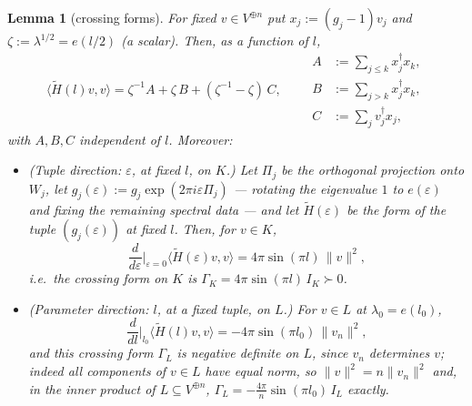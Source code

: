 \documentclass[11pt]{article}
\newtheorem{lemma}[theorem]{Lemma}
\theoremstyle{definition}
\newcommand{\Ht}{\widetilde H}
\begin{document}
\begin{lemma}[crossing forms]\label{lem:crossing}
For fixed $v\in V^{\oplus n}$ put $x_j:=(g_j-1)v_j$ and
$\zeta:=\lambda^{1/2}=e(l/2)$ (a scalar). Then, as a function of
$l$,
\begin{equation}\label{eq:ABC}
\langle\Ht(l)v,v\rangle
=\zeta^{-1}A+\zeta\,B+(\zeta^{-1}-\zeta)\,C,
\qquad
\begin{aligned}
A&:=\textstyle\sum_{j\le k}x_j^{\dagger}x_k,\\
B&:=\textstyle\sum_{j>k}x_j^{\dagger}x_k,\\
C&:=\textstyle\sum_{j}v_j^{\dagger}x_j,
\end{aligned}
\end{equation}
with $A,B,C$ independent of $l$. Moreover:
\begin{itemize}
\item[(i)] (\emph{Tuple direction}: $\varepsilon$, at fixed $l$, on $K$.) Let $\Pi_j$ be the
orthogonal projection onto $W_j$, let
$g_j(\varepsilon):=g_j\exp(2\pi i\varepsilon\Pi_j)$ --- rotating the
eigenvalue $1$ to $e(\varepsilon)$ and fixing the remaining spectral
data --- and let $\Ht(\varepsilon)$ be the form of the tuple
$(g_j(\varepsilon))$ at fixed $l$. Then, for $v\in K$,
\[
\frac{d}{d\varepsilon}\Big|_{\varepsilon=0}
\langle\Ht(\varepsilon)v,v\rangle
=4\pi\sin(\pi l)\,\lVert v\rVert^{2},
\]
i.e.\ the crossing form on $K$ is $\Gamma_K=4\pi\sin(\pi l)\,I_K\succ0$.
\item[(ii)] (\emph{Parameter direction}: $l$, at a fixed tuple, on $L$.) For $v\in L$ at $\lambda_0=e(l_0)$,
\[
\frac{d}{dl}\Big|_{l_0}\langle\Ht(l)v,v\rangle
=-4\pi\sin(\pi l_0)\,\lVert v_n\rVert^{2},
\]
and this crossing form $\Gamma_L$ is negative definite on $L$, since
$v_n$ determines $v$; indeed all components of $v\in L$ have equal
norm, so $\lVert v\rVert^{2}=n\lVert v_n\rVert^{2}$ and, in the
inner product of $L\subseteq V^{\oplus n}$,
$\Gamma_L=-\tfrac{4\pi}{n}\sin(\pi l_0)\,I_L$ exactly.
\end{itemize}
\end{lemma}
\end{document}
